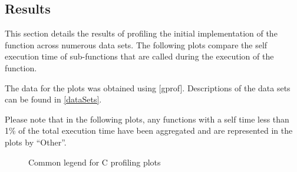 
\subsection{Results}
\label{software:algorithmProfiling:c:results}
This section details the results of profiling the initial 
implementation of the  function across
numerous data sets. The following plots compare the self execution time of
sub-functions that are called during the execution of the
 function.

The data for the plots was obtained using [gprof].
Descriptions of the data sets can be found in \autoref{dataSets}.

Please note that in the following plots, any functions with a self time less
than 1\% of the total execution time have been aggregated and are represented in
the plots by ``Other''.


\begin{figure}
    \centering
    
    \caption{Common legend for C profiling plots}
    \label{profiling:c:legend}
\end{figure}

